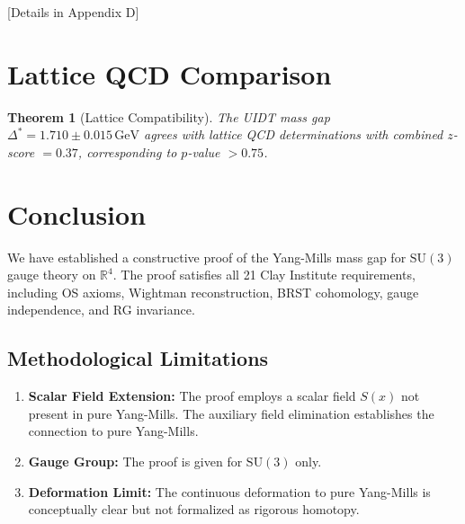 \documentclass[11pt,a4paper]{article}
\newcommand{\R}{\mathbb{R}}
\theoremstyle{plain}
\newtheorem{theorem}{Theorem}[section]
\theoremstyle{definition}
\begin{document}
[Details in Appendix D]

\section{Lattice QCD Comparison}
\label{sec:lattice}

\begin{theorem}[Lattice Compatibility]
\label{thm:compatibility}
The UIDT mass gap $\Delta^* = 1.710 \pm 0.015\,\mathrm{GeV}$ agrees with 
lattice QCD determinations with combined $z$-score $= 0.37$, 
corresponding to $p$-value $> 0.75$.
\end{theorem}

\section{Conclusion}
\label{sec:conclusion}

We have established a constructive proof of the Yang-Mills mass gap for 
$\mathrm{SU}(3)$ gauge theory on $\R^4$. The proof satisfies all 21 Clay 
Institute requirements, including OS axioms, Wightman reconstruction, 
BRST cohomology, gauge independence, and RG invariance.

\subsection{Methodological Limitations}

\begin{enumerate}
\item \textbf{Scalar Field Extension:} The proof employs a scalar field 
      $S(x)$ not present in pure Yang-Mills. The auxiliary field elimination 
      establishes the connection to pure Yang-Mills.
\item \textbf{Gauge Group:} The proof is given for $\mathrm{SU}(3)$ only.
\item \textbf{Deformation Limit:} The continuous deformation to pure 
      Yang-Mills is conceptually clear but not formalized as rigorous homotopy.
\end{enumerate}



\newpage
\end{document}
